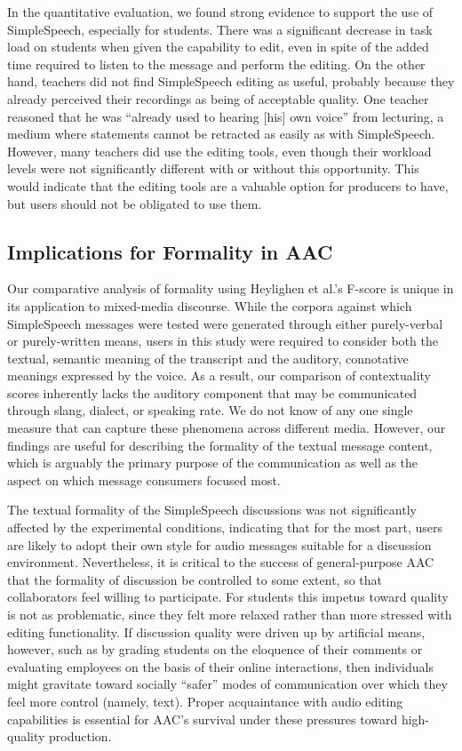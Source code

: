 In the quantitative evaluation, we found strong evidence to support the use of SimpleSpeech, especially for students.
There was a significant decrease in task load on students when given the capability to edit, even in spite of the added time required to listen to the message and perform the editing. 
On the other hand, teachers did not find SimpleSpeech editing as useful, probably because they already perceived their recordings as being of acceptable quality. 
One teacher reasoned that he was ``already used to hearing [his] own voice'' from lecturing, a medium where statements cannot be retracted as easily as with SimpleSpeech.
However, many teachers did use the editing tools, even though their workload levels were not significantly different with or without this opportunity.
This would indicate that the editing tools are a valuable option for producers to have, but users should not be obligated to use them.

\subsection{Implications for Formality in AAC}
Our comparative analysis of formality using Heylighen et al.'s F-score \cite{heylighen} is unique in its application to mixed-media discourse.
While the corpora against which SimpleSpeech messages were tested were generated through either purely-verbal or purely-written means, users in this study were required to consider both the textual, semantic meaning of the transcript and the auditory, connotative meanings expressed by the voice.
As a result, our comparison of contextuality scores inherently lacks the auditory component that may be communicated through slang, dialect, or speaking rate.
We do not know of any one single measure that can capture these phenomena across different media.
However, our findings are useful for describing the formality of the textual message content, which is arguably the primary purpose of the communication as well as the aspect on which message consumers focused most.

The textual formality of the SimpleSpeech discussions was not significantly affected by the experimental conditions, indicating that for the most part, users are likely to adopt their own style for audio messages suitable for a discussion environment.
Nevertheless, it is critical to the success of general-purpose AAC that the formality of discussion be controlled to some extent, so that collaborators feel willing to participate.
For students this impetus toward quality is not as problematic, since they felt more relaxed rather than more stressed with editing functionality.
If discussion quality were driven up by artificial means, however, such as by grading students on the eloquence of their comments or evaluating employees on the basis of their online interactions, then individuals might gravitate toward socially ``safer'' modes of communication over which they feel more control (namely, text).
Proper acquaintance with audio editing capabilities is essential for AAC's survival under these pressures toward high-quality production.

